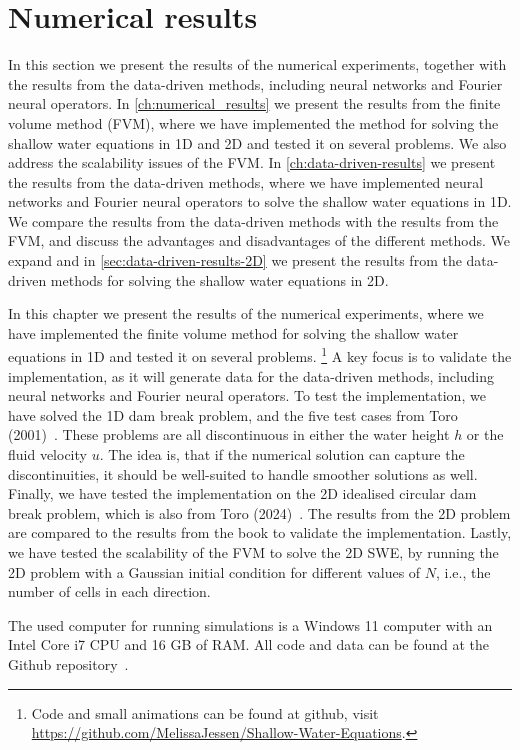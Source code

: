 \chapter{Numerical results}\label{ch:numerical_results}
In this section we present the results of the numerical experiments, together with the results from the data-driven methods, including neural networks and Fourier neural operators.
In \autoref{ch:numerical_results} we present the results from the finite volume method (FVM), where we have implemented the method for solving the shallow water equations in 1D  and 2D and tested it on several problems.
We also address the scalability issues of the FVM.
In \autoref{ch:data-driven-results} we present the results from the data-driven methods, where we have implemented neural networks and Fourier neural operators to solve the shallow water equations in 1D.
We compare the results from the data-driven methods with the results from the FVM, and discuss the advantages and disadvantages of the different methods.
We expand and in \autoref{sec:data-driven-results-2D} we present the results from the data-driven methods for solving the shallow water equations in 2D.

In this chapter we present the results of the numerical experiments, where we have implemented the finite volume method for solving the shallow water equations in 1D and tested it on several problems.
\footnote{Code and small animations can be found at github, visit \url{https://github.com/MelissaJessen/Shallow-Water-Equations}.}
A key focus is to validate the implementation, as it will generate data for the data-driven methods, including neural networks and Fourier neural operators.
To test the implementation, we have solved the 1D dam break problem, and the five test cases from Toro (2001)~\cite{Toro2001-Shock}.
These problems are all discontinuous in either the water height $h$ or the fluid velocity $u$.
The idea is, that if the numerical solution can capture the discontinuities, it should be well-suited to handle smoother solutions as well.
Finally, we have tested the implementation on the 2D idealised circular dam break problem, which is also from Toro (2024)~\cite{Toro2024}.
The results from the 2D problem are compared to the results from the book to validate the implementation.
Lastly, we have tested the scalability of the FVM to solve the 2D SWE, by running the 2D problem with a Gaussian initial condition for different values of $N$, i.e., the number of cells in each direction.

The used computer for running simulations is a Windows 11 computer with an Intel Core i7 CPU and 16 GB of RAM.
All code and data can be found at the Github repository~\cite{Github_SWE}.


